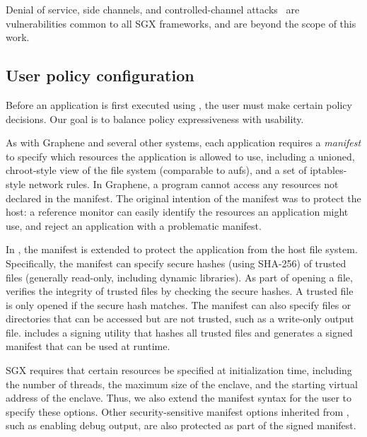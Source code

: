 
Denial of service, side channels, and controlled-channel attacks~\cite{xu15controlledchannel}
are vulnerabilities common to all SGX frameworks, and 
are beyond the scope of this work.



\subsection{User policy configuration}
\label{sec:sgx:overview:config}


Before an application is first executed using \graphenesgx{}, 
the user must make certain policy decisions.  
Our goal is to balance policy expressiveness
with usability.

As with Graphene and several other systems, each application requires a {\em manifest}
to specify which resources the application is allowed to use, including
a unioned, chroot-style view of the file system (comparable to aufs),
and a set of iptables-style network rules.
In Graphene, a program cannot access any resources not declared in the manifest.
The original intention of the manifest was to protect the host: a reference monitor 
can easily identify the resources an application might use, and reject an application
with a problematic manifest.

In \graphenesgx{}, the manifest is extended to protect the application from the host file system.
Specifically, the manifest can specify secure hashes (using SHA-256) of trusted files (generally read-only, including dynamic libraries). As part of opening a file,
\graphenesgx{} verifies the integrity of trusted files by checking the secure hashes.  A trusted file is only opened if the secure hash matches.
The manifest can also specify files or directories that can be accessed 
but are not trusted, such as a write-only output file.
\graphenesgx{} includes a signing utility that hashes all trusted files and 
generates a signed manifest that can be used at runtime.

SGX requires that certain resources be specified at initialization time, including the number of threads,
the maximum size of the enclave, and the starting virtual address of the enclave.  Thus, we also extend the manifest syntax for the 
user to specify these options.
Other security-sensitive manifest options inherited from \graphene{}, such as enabling debug output, are also protected as part of the signed manifest.



